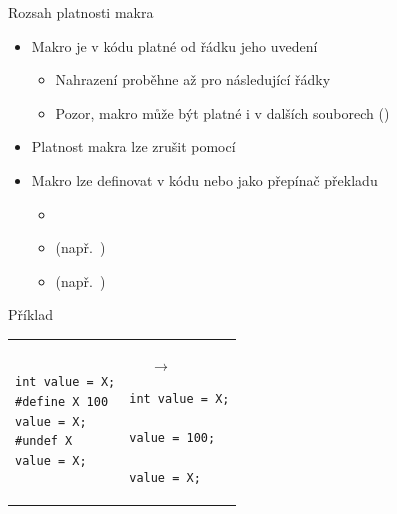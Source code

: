 \begin{frame}[fragile]{Rozsah platnosti makra}

  \begin{itemize}
    \item Makro je v kódu platné od řádku jeho uvedení
    \begin{itemize}
      \item Nahrazení proběhne až pro následující řádky
      \item Pozor, makro může být platné i v dalších souborech
        ()
    \end{itemize}

    \pause

    \item Platnost makra lze zrušit pomocí 


    \item Makro lze definovat v kódu nebo jako přepínač překladu
    \begin{itemize}
      \item {}
      \item {} (např.\ )
      \item {}
        (např.\ )
    \end{itemize}

  \end{itemize}


\begin{block}{Příklad}
\begin{center}
\begin{tabular}{ll}
\begin{lstlisting}
int value = X;
#define X 100
value = X;
#undef X
value = X;
\end{lstlisting}
& ~~~$\rightarrow$~~~~
\begin{lstlisting}
int value = X;

value = 100;

value = X;
\end{lstlisting}
\end{tabular}
\end{center}
\end{block}

\end{frame}

